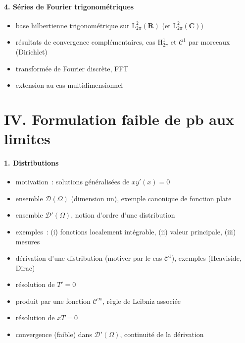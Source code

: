 \documentclass[11pt,a4paper]{article}
\def\R{\mathbf{R}}
\def\C{\mathbf{C}}
\def\DD{\mathscr{D}}
\def\CC{\mathscr{C}}
\def\L{\mathrm{L}}
\def\H{\mathrm{H}}
\def\iy{\infty}
\theoremstyle{plain}
\theoremstyle{definition}
\begin{document}
\paragraph{4. S\'eries de Fourier trigonom\'etriques}
\begin{itemize}
  \item base hilbertienne trigonom\'etrique sur $\L^2_{2\pi}(\R)$ (et $\L^2_{2\pi}(\C)$)
  \item r\'esultats de convergence compl\'ementaires, cas $\H^1_{2\pi}$
  et $\mathscr{C}^1$ par morceaux (Dirichlet)
  \item transform\'ee de Fourier discr\`ete, FFT
  \item extension au cas multidimensionnel  
\end{itemize}

\section*{IV. Formulation faible de pb aux limites}
\paragraph{1. Distributions}
\begin{itemize}
\item motivation~: solutions g\'en\'eralis\'ees de $xy'(x)=0$ 
\item ensemble $\DD(\Omega)$ (dimension un), exemple canonique de fonction plate
\item ensemble $\DD'(\Omega)$, notion d'ordre d'une distribution 
\item exemples~: (i) fonctions localement int\'egrable, (ii) valeur principale,
(iii) mesures
\item d\'erivation d'une distribution (motiver par le cas $\CC^1$), exemples
(Heaviside, Dirac)
\item r\'esolution de $T'=0$
\item produit par une fonction $\CC^\iy$, r\`egle de Leibniz associ\'ee
\item r\'esolution de $xT=0$
\item convergence (faible) dans $\DD'(\Omega)$, continuit\'e de la d\'erivation
\end{itemize}
\end{document}
